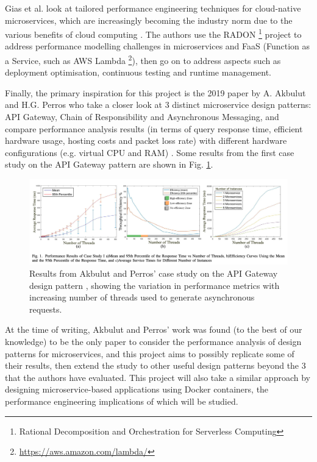Gias et al. look at tailored performance engineering techniques for cloud-native microservices, which are increasingly
becoming the industry norm due to the various benefits of cloud computing \cite{gias20}. The authors use the RADON
\footnote{Rational Decomposition and Orchestration for Serverless Computing} project to address performance modelling
challenges in microservices and FaaS (Function as a Service, such as AWS Lambda \footnote{\url{https://aws.amazon.com/lambda/}}),
then go on to address aspects such as deployment optimisation, continuous testing and runtime management.

Finally, the primary inspiration for this project is the 2019 paper by A. Akbulut and H.G. Perros who take a closer look at
3 distinct microservice design patterns: API Gateway, Chain of Responsibility and Asynchronous Messaging, and compare
performance analysis results (in terms of query response time, efficient hardware usage, hosting costs and packet loss rate)
with different hardware configurations (e.g. virtual CPU and RAM) \cite{akbulut19}. Some results from the first case study
on the API Gateway pattern are shown in Fig. \ref{fig:akbulut19-results}.

\begin{figure}[h]
  \centering
  \includegraphics[width=1.0\linewidth]{./assets/images/related-work/akbulut19-results}
  \caption{Results from Akbulut and Perros' case study on the API Gateway design pattern \cite{akbulut19}, showing the
    variation in performance metrics with increasing number of threads used to generate asynchronous requests.}
  \label{fig:akbulut19-results}
\end{figure}

At the time of writing, Akbulut and Perros' work was found (to the best of our knowledge) to be the only paper to consider
the performance analysis of design patterns for microservices, and this project aims to possibly replicate some of their
results, then extend the study to other useful design patterns beyond the 3 that the authors have evaluated. This project
will also take a similar approach by designing microservice-based applications using Docker containers, the performance engineering
implications of which will be studied.

